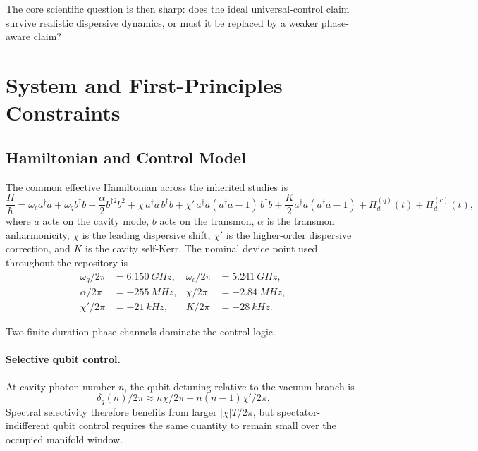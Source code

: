 \documentclass[11pt]{article}
\begin{document}
The core scientific question is then sharp: does the ideal universal-control claim survive realistic dispersive dynamics, or must it be replaced by a weaker phase-aware claim?

\section{System and First-Principles Constraints}
\label{sec:system}

\subsection{Hamiltonian and Control Model}

The common effective Hamiltonian across the inherited studies is
\begin{equation}
\frac{H}{\hbar} =
\omega_c a^\dagger a
 +
\omega_q b^\dagger b
 +
\frac{\alpha}{2} b^{\dagger 2} b^2
 +
\chi\, a^\dagger a\, b^\dagger b
 +
\chi' \, a^\dagger a (a^\dagger a - 1)\, b^\dagger b
 +
\frac{K}{2} a^\dagger a (a^\dagger a - 1)
 +
H_d^{(q)}(t)
 +
H_d^{(c)}(t),
\label{eq:hamiltonian}
\end{equation}
where $a$ acts on the cavity mode, $b$ acts on the transmon, $\alpha$ is the transmon anharmonicity, $\chi$ is the leading dispersive shift, $\chi'$ is the higher-order dispersive correction, and $K$ is the cavity self-Kerr. The nominal device point used throughout the repository is
\begin{align}
\omega_q/2\pi &= \SI{6.150}{GHz}, &
\omega_c/2\pi &= \SI{5.241}{GHz}, \nonumber\\
\alpha/2\pi &= \SI{-255}{MHz}, &
\chi/2\pi &= \SI{-2.84}{MHz}, \nonumber\\
\chi'/2\pi &= \SI{-21}{kHz}, &
K/2\pi &= \SI{-28}{kHz}.
\label{eq:device}
\end{align}

Two finite-duration phase channels dominate the control logic.

\paragraph{Selective qubit control.}
At cavity photon number $n$, the qubit detuning relative to the vacuum branch is
\begin{equation}
\delta_q(n)/2\pi \approx n \chi/2\pi + n(n-1)\chi'/2\pi .
\label{eq:qubit_detuning}
\end{equation}
Spectral selectivity therefore benefits from larger $|\chi|T/2\pi$, but spectator-indifferent qubit control requires the same quantity to remain small over the occupied manifold window.
\end{document}
